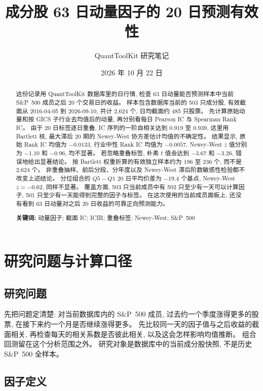 \documentclass[11pt,a4paper]{article}
\title{\bfseries \SP{} 成分股 63 日动量因子的 20 日预测有效性}
\author{QuantToolKit 研究笔记}
\date{2026 年 10 月 22 日}
\newcommand{\SP}{S\&P~500}
\begin{document}
\maketitle

\begin{abstract}
\noindent
这份记录用 QuantToolKit 数据库里的日行情, 检查 63 日动量能否预测样本中当前 \SP{} 成员之后 20 个交易日的收益。
样本包含数据库当前的 503 只成分股, 有效截面从 2016-04-05 到 2026-09-10, 共计 2{,}624 个, 日均截面约 485 只股票。
先计算原始动量和按 GICS 子行业去均值后的动量, 再分别看每日 Pearson IC 与 Spearman Rank IC。
由于 20 日标签逐日重叠, IC 序列的一阶自相关达到 0.919 至 0.939, 这里用 Bartlett 核, 最大滞后 20 期的 Newey-West 协方差估计均值的不确定性。
结果显示, 原始 Rank IC 均值为 $-0.0133$, 行业中性 Rank IC 均值为 $-0.0057$, Newey-West $z$ 值分别为 $-1.10$ 和 $-0.96$, 均不显著。
若忽略重叠标签, 朴素 $t$ 值会达到 $-3.67$ 和 $-3.26$, 错误地给出显著结论。
按 Bartlett 权重折算的有效独立样本约为 196 至 236 个, 而不是 2{,}624 个。
非重叠抽样、前后分段、分年度以及 Newey-West 滞后阶数敏感性检验都不改变上述结论。
分位组合的 $Q5-Q1$ 20 日平均价差为 $-19.4$ 个基点, Newey-West $z=-0.62$, 同样不显著。
覆盖方面, 503 只当前成员中有 502 只至少有一天可以计算因子, 501 只至少有一天能得到完整的因子与标签。
在这次使用的当前成员面板上, 还没有看到 63 日动量对之后 20 日收益的可靠正向预测能力。

\vspace{0.6em}
\noindent\textbf{关键词:} 动量因子; 截面 IC; ICIR; 重叠标签; Newey-West; \SP
\end{abstract}

\newpage
\tableofcontents
\newpage

\section{研究问题与计算口径}

\subsection{研究问题}

先把问题定清楚: 对当前数据库内的 \SP{} 成员, 过去约一个季度涨得更多的股票, 在接下来约一个月是否继续涨得更多。
先比较同一天的因子值与之后收益的截面相关, 再检查每天的相关系数是否彼此相关, 以及这会怎样影响均值推断。
组合回测留在这个分析范围之外。
研究对象是数据库中的当前成分股快照, 不是历史 \SP{} 全样本。

\subsection{因子定义}
\end{document}
